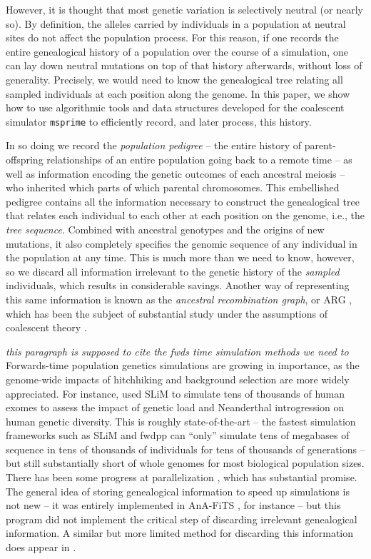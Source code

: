 \documentclass{article}
\newcommand{\msprime}{\texttt{msprime}}
\newcommand{\plr}[1]{{\em \color{blue} #1}}
\begin{document}
However, it is thought that most genetic variation is selectively neutral (or nearly so).
By definition, the alleles carried by individuals in a population at neutral sites
do not affect the population process.
For this reason, if one records the entire genealogical history of a population over the course of a simulation,
one can lay down neutral mutations on top of that history afterwards,
without loss of generality.
Precisely, we would need to know the genealogical tree relating all sampled individuals
at each position along the genome.
In this paper, we show how to use algorithmic tools and data structures developed for the 
coalescent simulator \msprime{}
to efficiently record, and later process, this history.

In so doing we record the \emph{population pedigree} --
the entire history of parent-offspring relationships of an entire population going back to a remote time --
as well as information encoding the genetic outcomes of each ancestral meiosis --
who inherited which parts of which parental chromosomes.
This embellished pedigree contains all the information necessary
to construct the genealogical tree that relates each individual to each other
at each position on the genome, i.e., the \emph{tree sequence}.
Combined with ancestral genotypes and the origins of new mutations,
it also completely specifies the genomic sequence of any individual in the population at any time.
This is much more than we need to know, however,
so we discard all information irrelevant to the genetic history
of the \emph{sampled} individuals,
which results in considerable savings.
Another way of representing this same information
is known as the \emph{ancestral recombination graph}, or {ARG} \citep{griffiths1997ancestral},
which has been the subject of substantial study
under the assumptions of coalescent theory \citep{wiuf1997number,wiuf1999ancestry,marjoram2006coalescent,wilton2015smc}.

\plr{this paragraph is supposed to cite the fwds time simulation methods we need to}
Forwards-time population genetics simulations are growing in importance,
as the genome-wide impacts of hitchhiking and background selection are more widely appreciated.
For instance, \citet{harris2016genetic} used SLiM \citep{haller2017flexible} to simulate tens of thousands of human exomes
to assess the impact of genetic load and Neanderthal introgression on human genetic diversity.
This is roughly state-of-the-art 
-- the fastest simulation frameworks such as SLiM and fwdpp \citep{fwdpp}
can ``only'' simulate tens of megabases of sequence in tens of thousands of individuals
for tens of thousands of generations --
but still substantially short of whole genomes for most biological population sizes.
There has been some progress at parallelization \citep{lawrie2017accelerating},
which has substantial promise.
The general idea of storing genealogical information to speed up simulations is not new --
it was entirely implemented in AnA-FiTS \citep{aberer2013rapid}, for instance --
but this program did not implement the critical step of discarding irrelevant genealogical information.
A similar but more limited method for discarding this information does appear in \citet{padhukasahasram2008exploring}.
\end{document}
